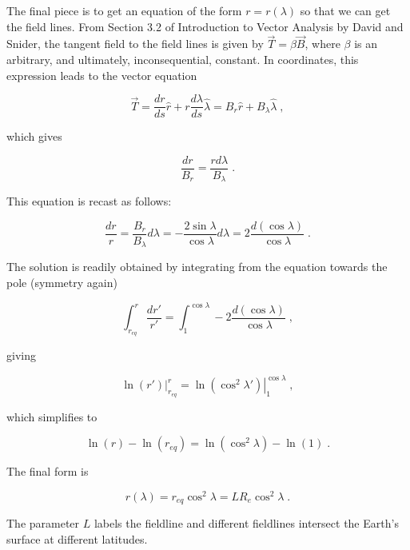 \documentclass[12pt]{article}
\begin{document}
The final piece is to get an equation of the form $r = r(\lambda)$ so that we can get the field lines.  From Section 3.2 of Introduction to Vector Analysis by David and Snider, the tangent field to the field lines is given by $\vec T = \beta \vec B$, where $\beta$ is an arbitrary, and ultimately, inconsequential, constant.  In coordinates, this expression leads to the vector equation

\[ \vec T = \frac{d r}{d s} \hat r + r \frac{d \lambda}{d s} \hat \lambda = B_r \hat r + B_{\lambda} \hat \lambda \; , \] 

which gives

\[ \frac{dr}{B_r} = \frac{r d \lambda}{B_{\lambda}} \; . \]

This equation is recast as follows:

\[ \frac{dr}{r} = \frac{B_r}{B_{\lambda}} d \lambda = - \frac{2 \sin \lambda}{\cos \lambda} d \lambda = 2 \frac{d(\cos \lambda)}{\cos \lambda} \; . \]

The solution is readily obtained by integrating from the equation towards the pole (symmetry again)

\[ \int_{r_{eq}}^{r} \frac{dr'}{r'} = \int_{1}^{\cos \lambda}  - 2 \frac{ d(\cos \lambda) }{ \cos \lambda } \; , \]

giving

\[ \left. \ln(r') \right|^r_{r_{eq}} = \left. \ln( \cos^2 \lambda' )  \right|_1^{\cos \lambda} \; , \]

which simplifies to 

\[ \ln(r)- \ln(r_{eq}) = \ln(\cos^2 \lambda) - \ln(1) \; . \]

The final form is 

\[ r(\lambda) = r_{eq} \cos^2 \lambda = L R_e \cos^2 \lambda \; . \]

The parameter $L$ labels the fieldline and different fieldlines intersect the Earth's surface at different latitudes.

 
 
\end{document}
